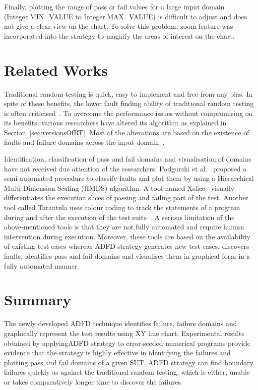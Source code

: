 Finally, plotting the range of pass or fail values for a large input domain (Integer.MIN\_VALUE to Integer.MAX\_VALUE) is difficult to adjust and does not give a clear view on the chart. To solve this problem, zoom feature was incorporated into the strategy to magnify the areas of interest on the chart.



\section{Related Works} \label{sec:relatedWork}
Traditional random testing is quick, easy to implement and free from any bias. In spite of these benefits, the lower fault finding ability of traditional random testing is often criticised~\cite{myers2011art, offutt1996semantic}. To overcome the performance issues without compromising on its benefits, various researchers have altered its algorithm as explained in Section~\ref{sec:versionsOfRT}. Most of the alterations are based on the existence of faults and failure domains across the input domain~\cite{chan1996proportional}. 

Identification, classification of pass and fail domains and visualisation of domains have not received due attention of the researchers. Podgurski et al.~\cite{podgurski2003automated} proposed a semi-automated procedure to classify faults and plot them by using a Hierarchical Multi Dimension Scaling (HMDS) algorithm. A tool named Xslice~\cite{agrawal1995fault} visually differentiates the execution slices of passing and failing part of the test. Another tool called Tarantula uses colour coding to track the statements of a program during and after the execution of the test suite~\cite{jones2002visualization}. A serious limitation of the above-mentioned tools is that they are not fully automated and require human intervention during execution. Moreover, these tools are based on the availability of existing test cases whereas ADFD strategy generates new test cases, discovers faults, identifies pass and fail domains and visualises them in graphical form in a fully automated manner. 


\section{Summary} \label{sec:conclusion}
The newly developed ADFD technique identifies failure, failure domains and graphically represent the test results using XY line chart. Experimental results obtained by applyingADFD strategy to error-seeded numerical programs provide evidence that the strategy is highly effective in identifying the failures and plotting pass and fail domains of a given SUT. ADFD strategy can find boundary failures quickly as against the traditional random testing, which is either, unable or takes comparatively longer time to discover the failures.

